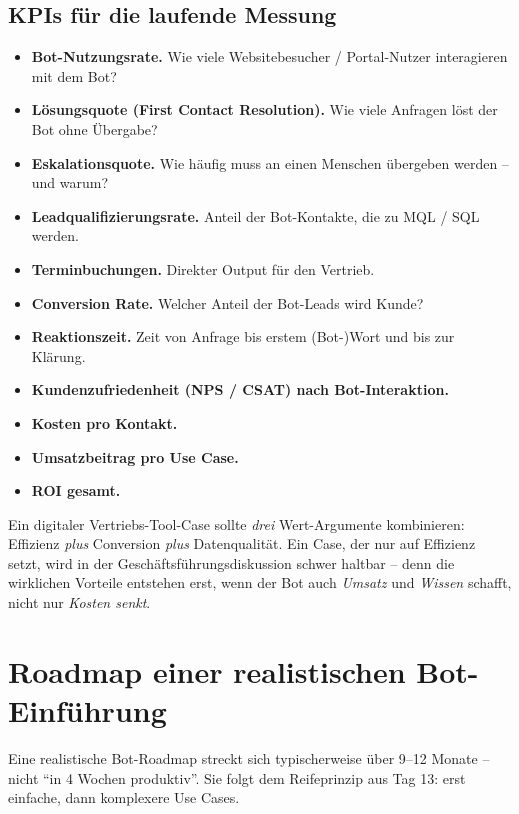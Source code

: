 \documentclass[11pt,a4paper,oneside]{article}
\begin{document}
\subsection{KPIs für die laufende Messung}

\begin{itemize}
  \item \textbf{Bot-Nutzungsrate.} Wie viele Websitebesucher / Portal-Nutzer interagieren mit dem Bot?
  \item \textbf{Lösungsquote (First Contact Resolution).} Wie viele Anfragen löst der Bot ohne Übergabe?
  \item \textbf{Eskalationsquote.} Wie häufig muss an einen Menschen übergeben werden -- und warum?
  \item \textbf{Leadqualifizierungsrate.} Anteil der Bot-Kontakte, die zu MQL / SQL werden.
  \item \textbf{Terminbuchungen.} Direkter Output für den Vertrieb.
  \item \textbf{Conversion Rate.} Welcher Anteil der Bot-Leads wird Kunde?
  \item \textbf{Reaktionszeit.} Zeit von Anfrage bis erstem (Bot-)Wort und bis zur Klärung.
  \item \textbf{Kundenzufriedenheit (NPS / CSAT) nach Bot-Interaktion.}
  \item \textbf{Kosten pro Kontakt.}
  \item \textbf{Umsatzbeitrag pro Use Case.}
  \item \textbf{ROI gesamt.}
\end{itemize}

\begin{merkbox}
Ein digitaler Vertriebs-Tool-Case sollte \emph{drei} Wert-Argumente kombinieren: Effizienz \emph{plus} Conversion \emph{plus} Datenqualität. Ein Case, der nur auf Effizienz setzt, wird in der Geschäftsführungsdiskussion schwer haltbar -- denn die wirklichen Vorteile entstehen erst, wenn der Bot auch \emph{Umsatz} und \emph{Wissen} schafft, nicht nur \emph{Kosten senkt}.
\end{merkbox}

\section{Roadmap einer realistischen Bot-Einführung}

Eine realistische Bot-Roadmap streckt sich typischerweise über 9--12 Monate -- nicht ``in 4 Wochen produktiv''. Sie folgt dem Reifeprinzip aus Tag 13: erst einfache, dann komplexere Use Cases.
\end{document}
